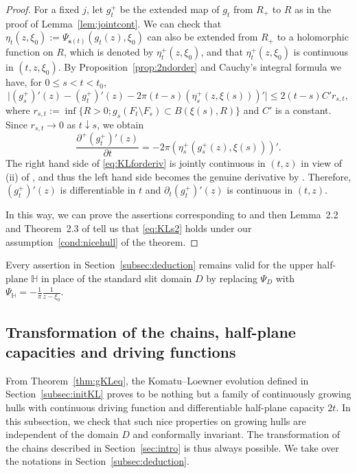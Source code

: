 \documentclass[preprint,12pt]{elsarticle}
\theoremstyle{definition}
\newcommand{\uhp}{\mathbb{H}}
\newcommand{\slit}{\mathbf{s}}
\begin{document}
\begin{proof}
For a fixed $j$, let $g^+_t$ be the extended map of $g_t$ from $R_+$ to $R$
as in the proof of Lemma~\ref{lem:jointcont}.
We can check that $\eta_t(z, \xi_0):=\Psi_{\slit(t)}(g_t(z), \xi_0)$
can also be extended from $R_+$ to a holomorphic function on $R$,
which is denoted by $\eta^+_t(z, \xi_0)$,
and that $\eta^+_t(z, \xi_0)$ is continuous in $(t, z, \xi_0)$. 
By Proposition~\ref{prop:2ndorder} and Cauchy's integral formula we have,
for $0 \leq s < t < t_0$,
\[
\lvert (g^+_s)'(z)-(g^+_t)'(z)-2\pi (t-s) (\eta^+_s(z, \xi(s)))' \rvert
\leq 2(t-s) C' r_{s,t},
\]
where $r_{s,t}:=\inf\{R>0; g_s(F_t \setminus F_s) \subset B(\xi(s), R)\}$
and $C'$ is a constant.
Since $r_{s,t} \to 0$ as $t \downarrow s$, we obtain
\begin{equation} \label{eq:KLforderiv}
\frac{\partial^+(g^+_t)'(z)}{\partial t}=-2\pi (\eta^+_s(g^+_s(z), \xi(s)))'.
\end{equation}
The right hand side of \eqref{eq:KLforderiv} is jointly continuous in $(t,z)$
in view of (ii) of \cite[Lemma~2.1]{CF18}, and thus
the left hand side becomes the genuine derivative by \cite[Lemma~4.3]{La05}.
Therefore, $(g^+_t)'(z)$ is differentiable in $t$ and
$\partial_t(g^+_t)'(z)$ is continuous in $(t, z)$.

In this way, we can prove the assertions corresponding to \cite[Lemma~2.1]{CF18}
and then Lemma~2.2 and Theorem~2.3 of \cite{CF18}
tell us that \eqref{eq:KLs2} holds under
our assumption~\eqref{cond:nicehull} of the theorem.
\end{proof}

Every assertion in Section~\ref{subsec:deduction} remains valid
for the upper half-plane $\uhp$ in place of the standard slit domain $D$
by replacing $\Psi_D$ with $\Psi_{\uhp}=-\frac{1}{\pi}\frac{1}{z-\xi_0}$.

\subsection{Transformation of the chains, half-plane capacities and driving functions}
\label{subsec:trans}

From Theorem~\ref{thm:gKLeq}, the Komatu--Loewner evolution
defined in Section~\ref{subsec:initKL} proves to be
nothing but a family of continuously growing hulls
with continuous driving function and differentiable half-plane capacity $2t$.
In this subsection, we check that such nice properties on growing hulls
are independent of the domain $D$ and conformally invariant.
The transformation of the chains described in Section~\ref{sec:intro}
is thus always possible.
We take over the notations in Section~\ref{subsec:deduction}.
\end{document}
